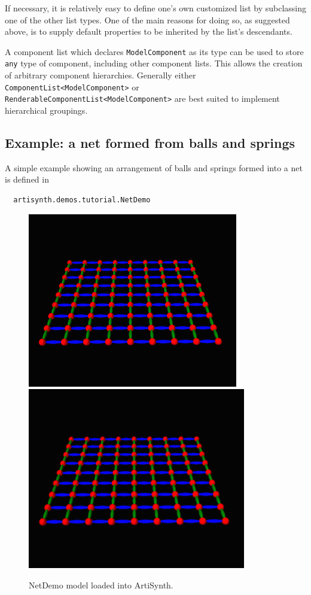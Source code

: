 If necessary, it is relatively easy to define one's own customized
list by subclassing one of the other list types. One of the main
reasons for doing so, as suggested above, is to supply default
properties to be inherited by the list's descendants.  

A component list which declares {\tt ModelComponent} as its type can
be used to store {\tt any} type of component, including other
component lists. This allows the creation of arbitrary component
hierarchies. Generally either\\
{\tt ComponentList<ModelComponent>} or 
{\tt RenderableComponentList<ModelComponent>} are
best suited to implement hierarchical groupings.

\subsection{Example: a net formed from balls and springs}

A simple example showing an arrangement of balls and springs formed into
a net is defined in
%
\begin{verbatim}
  artisynth.demos.tutorial.NetDemo
\end{verbatim}
%

\begin{figure}[ht]
\begin{center}
\iflatexml
 \includegraphics[]{images/NetDemo}
\else
 \includegraphics[width=3.75in]{images/NetDemo}
\fi
\end{center}
\caption{NetDemo model loaded into ArtiSynth.}
\label{NetDemo:fig}
\end{figure}

